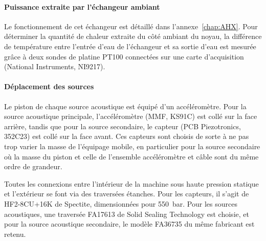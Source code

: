 \paragraph*{Puissance extraite par l'échangeur ambiant} Le fonctionnement de cet échangeur est détaillé dans l'annexe~\ref{chap:AHX}. Pour déterminer la quantité de chaleur extraite du côté ambiant du noyau, la différence de température entre l'entrée d'eau de l'échangeur et sa sortie d'eau est mesurée grâce à deux sondes de platine PT100 connectées sur une carte d'acquisition (National Instruments, NI9217).

\paragraph*{Déplacement des sources} Le piston de chaque source acoustique est équipé d'un accéléromètre. Pour la source acoustique principale, l'accéléromètre (MMF, KS91C) est collé sur la face arrière, tandis que pour la source secondaire, le capteur (PCB Piezotronics, 352C23) est collé sur la face avant. Ces capteurs sont choisis de sorte à ne pas trop varier la masse de l'équipage mobile, en particulier pour la source secondaire où la masse du piston et celle de l'ensemble accéléromètre et câble sont du même ordre de grandeur.\bigskip

Toutes les connexions entre l'intérieur de la machine sous haute pression statique et l'extérieur se font via des traversées étanches. Pour les capteurs, il s'agit de HF2-8CU+16K de Spectite, dimensionnées pour \qty{550}{\bar}. Pour les sources acoustiques, une traversée FA17613 de Solid Sealing Technology est choisie, et pour la source acoustique secondaire, le modèle FA36735 du même fabricant est retenu.



%    

